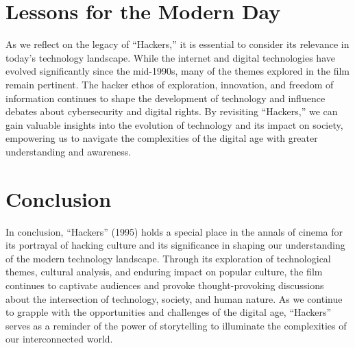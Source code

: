 \documentclass[
  openany]{book}
\begin{document}
\hypertarget{lessons-for-the-modern-day}{%
\chapter{Lessons for the Modern Day}\label{lessons-for-the-modern-day}}

As we reflect on the legacy of ``Hackers,'' it is essential to consider its relevance in today's technology landscape. While the internet and digital technologies have evolved significantly since the mid-1990s, many of the themes explored in the film remain pertinent. The hacker ethos of exploration, innovation, and freedom of information continues to shape the development of technology and influence debates about cybersecurity and digital rights. By revisiting ``Hackers,'' we can gain valuable insights into the evolution of technology and its impact on society, empowering us to navigate the complexities of the digital age with greater understanding and awareness.

\hypertarget{conclusion}{%
\chapter{Conclusion}\label{conclusion}}

In conclusion, ``Hackers'' (1995) holds a special place in the annals of cinema for its portrayal of hacking culture and its significance in shaping our understanding of the modern technology landscape. Through its exploration of technological themes, cultural analysis, and enduring impact on popular culture, the film continues to captivate audiences and provoke thought-provoking discussions about the intersection of technology, society, and human nature. As we continue to grapple with the opportunities and challenges of the digital age, ``Hackers'' serves as a reminder of the power of storytelling to illuminate the complexities of our interconnected world.
\end{document}
